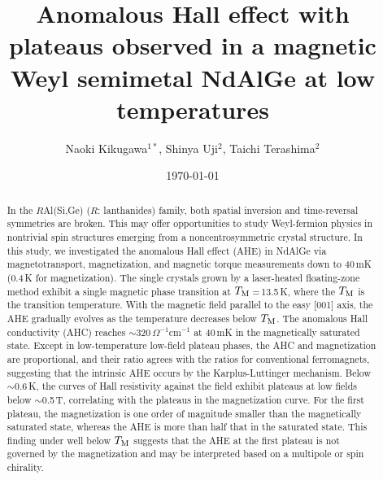 \documentclass[%
preprint,
 amsmath,amssymb,
 aps,
]{revtex4-2}
\begin{document}

\title{Anomalous Hall effect with plateaus observed in a magnetic Weyl semimetal NdAlGe at low temperatures}%

\author{
Naoki Kikugawa$^{1*}$, 
Shinya Uji$^{2}$, 
Taichi Terashima$^{2}$
}




\date{\today}%

\begin{abstract}
%
In the $R$Al(Si,Ge) ($R$: lanthanides) family, both spatial inversion and time-reversal symmetries 
are broken. 
%
This may offer opportunities to study Weyl-fermion physics in nontrivial spin structures emerging 
from a noncentrosymmetric crystal structure. 
%
In this study, we investigated the anomalous Hall effect (AHE) in NdAlGe via magnetotransport, 
magnetization, and magnetic torque measurements down to 40\,mK (0.4\,K for magnetization). 
%
The single crystals grown by a laser-heated floating-zone method exhibit 
a single magnetic phase transition at $T_{\rm M}$\,=\,13.5\,K, 
where the $T_{\rm M}$ is the transition temperature. 
%
With the magnetic field parallel to the easy $\lbrack$001$\rbrack$ axis, 
the AHE gradually evolves as the temperature decreases below $T_{\rm M}$. 
%
The anomalous Hall conductivity (AHC) reaches $\sim$320\,$\Omega^{-1}$cm$^{-1}$ at 40\,mK 
in the magnetically saturated state. 
%
Except in low-temperature low-field plateau phases, 
the AHC and magnetization are proportional, 
and their ratio agrees with the ratios for conventional ferromagnets, 
suggesting that the intrinsic AHE occurs by the Karplus-Luttinger mechanism. 
%
Below $\sim$0.6\,K, the curves of Hall resistivity against the field exhibit plateaus at low fields 
below $\sim$0.5\,T, 
correlating with the plateaus in the magnetization curve. 
%
For the first plateau, the magnetization is one order of magnitude smaller 
than the magnetically saturated state, 
whereas the AHE is more than half that in the saturated state. 
%
This finding under well below $T_{\rm M}$ suggests that 
the AHE at the first plateau is not governed by the magnetization and 
may be interpreted based on a multipole or spin chirality.
%

\end{abstract}
\end{document}
